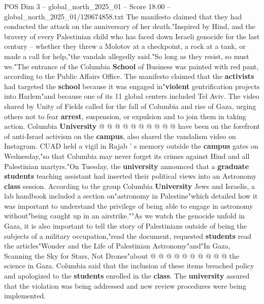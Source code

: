 \begin{textsample}{POS Dim 3 – global\_north\_2025\_01 – Score 18.00 – global\_north\_2025\_01/120674858.txt}
The manifesto claimed that they had conducted the attack on the anniversary of her death."Inspired by Hind, and the bravery of every Palestinian child who has faced down Israeli genocide for the last century -- whether they threw a Molotov at a checkpoint, a rock at a tank, or made a call for help,"the vandals allegedly said."So long as they resist, so must we."The entrance of the Columbia \textbf{School} of Business was painted with red pant, according to the Public Affairs Office.
The manifesto claimed that the \textbf{activists} had targeted the \textbf{school} because it was engaged in"\textbf{violent} gentrification projects into Harlem"and because one of its 11 global centers included Tel Aviv.
The video shared by Unity of Fields called for the fall of Columbia and rise of Gaza, urging others not to fear \textbf{arrest}, suspension, or expulsion and to join them in taking action.
Columbia \textbf{University} @ @ @ @ @ @ @ @ @ @ have been on the forefront of anti-Israel activism on the \textbf{campus}, also shared the vandalism video on Instagram.
CUAD held a vigil in Rajab ' s memory outside the \textbf{campus} gates on Wednesday,"so that Columbia may never forget its crimes against Hind and all Palestinian martyrs."On Tuesday, the \textbf{university} announced that a \textbf{graduate} \textbf{students} teaching assistant had inserted their political views into an Astronomy \textbf{class} session.
According to the group Columbia \textbf{University} Jews and Israelis, a lab handbook included a section on"astronomy in Palestine"which detailed how it was important to understand the privilege of being able to engage in astronomy without"being caught up in an airstrike.""As we watch the genocide unfold in Gaza, it is also important to tell the story of Palestinians outside of being the subjects of a military occupation,"read the document, requested \textbf{students} read the articles"Wonder and the Life of Palestinian Astronomy"and"In Gaza, Scanning the Sky for Stars, Not Drones"about @ @ @ @ @ @ @ @ @ @ the science in Gaza.
Columbia said that the inclusion of these items breached policy and apologized to the \textbf{students} enrolled in the \textbf{class}.
The \textbf{university} assured that the violation was being addressed and new review procedures were being implemented.

\end{textsample}
